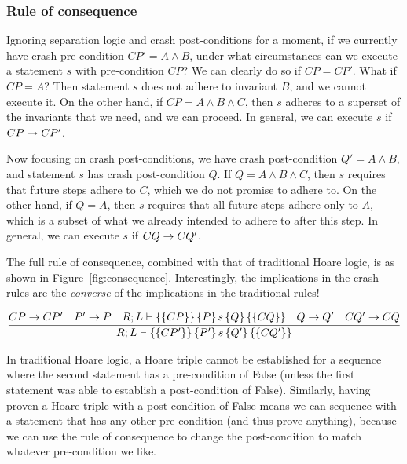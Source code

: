 \subsubsection{Rule of consequence}


Ignoring separation logic and crash post-conditions for a moment, if we
currently have crash pre-condition $CP'=A \wedge B$, under what circumstances
can we execute a statement $s$ with pre-condition $CP$? We can clearly do so if
$CP=CP'$. What if $CP=A$? Then statement $s$ does not adhere to invariant $B$,
and we cannot execute it. On the other hand, if $CP=A \wedge B \wedge C$, then
$s$ adheres to a superset of the invariants that we need, and we can proceed. In
general, we can execute $s$ if $CP \rightarrow CP'$.

Now focusing on crash post-conditions, we have crash post-condition $Q'=A \wedge
B$, and statement $s$ has crash post-condition $Q$. If $Q=A \wedge B \wedge C$,
then $s$ requires that future steps adhere to $C$, which we do not promise to
adhere to. On the other hand, if $Q=A$, then $s$ requires that all future steps
adhere only to $A$, which is a subset of what we already intended to adhere to
after this step. In general, we can execute $s$ if $CQ \rightarrow CQ'$.

The full rule of consequence, combined with that of traditional Hoare logic, is
as shown in Figure~\ref{fig:consequence}. Interestingly, the implications in
the crash rules are the \textit{converse} of the implications in the traditional
rules!

\begin{figure*}
\begin{gather*}
\infer{\hoarestmt{R}{L}{CP'}{P'}{s}{Q'}{CQ'}}
      {CP \imp CP' & P' \imp P & \hoarestmt{R}{L}{CP}{P}{s}{Q}{CQ}
      & Q \imp Q' & CQ' \imp CQ}
\end{gather*}
\caption{Rule of Consequence}
\label{fig:consequence}
\end{figure*}

In traditional Hoare logic, a Hoare triple cannot be established for a sequence
where the second statement has a pre-condition of False (unless the first
statement was able to establish a post-condition of False). Similarly, having
proven a Hoare triple with a post-condition of False means we can sequence with
a statement that has any other pre-condition (and thus prove anything), because
we can use the rule of consequence to change the post-condition to match
whatever pre-condition we like.

